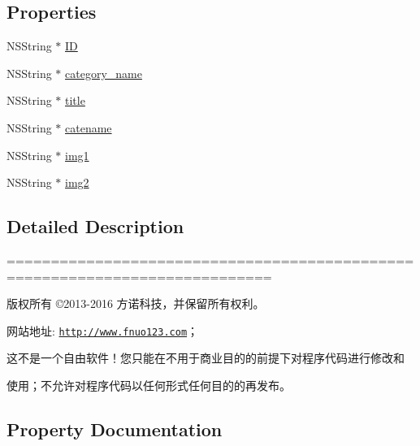 \subsection*{Properties}
\begin{DoxyCompactItemize}
\item 
N\+S\+String $\ast$ \mbox{\hyperlink{interface_j_m_home_category_model_a0b80c94de13a13830e0471397e473829}{ID}}
\item 
N\+S\+String $\ast$ \mbox{\hyperlink{interface_j_m_home_category_model_aaa849b849559ae9340d04c284161c040}{category\+\_\+name}}
\item 
N\+S\+String $\ast$ \mbox{\hyperlink{interface_j_m_home_category_model_af8fb49cdd1ae88c35c04185768aabe89}{title}}
\item 
N\+S\+String $\ast$ \mbox{\hyperlink{interface_j_m_home_category_model_a9dce9139fc6997390ae1a7a9678ace78}{catename}}
\item 
N\+S\+String $\ast$ \mbox{\hyperlink{interface_j_m_home_category_model_a5d556678236e82894c228d2df594bb99}{img1}}
\item 
N\+S\+String $\ast$ \mbox{\hyperlink{interface_j_m_home_category_model_a4ea471d289408a0488bc540835a5dab2}{img2}}
\end{DoxyCompactItemize}


\subsection{Detailed Description}
============================================================================

版权所有 ©2013-\/2016 方诺科技，并保留所有权利。

网站地址\+: \href{http://www.fnuo123.com}{\tt http\+://www.\+fnuo123.\+com}； 



这不是一个自由软件！您只能在不用于商业目的的前提下对程序代码进行修改和

使用；不允许对程序代码以任何形式任何目的的再发布。 

 

\subsection{Property Documentation}
\mbox{\label{interface_j_m_home_category_model_aaa849b849559ae9340d04c284161c040}} 
